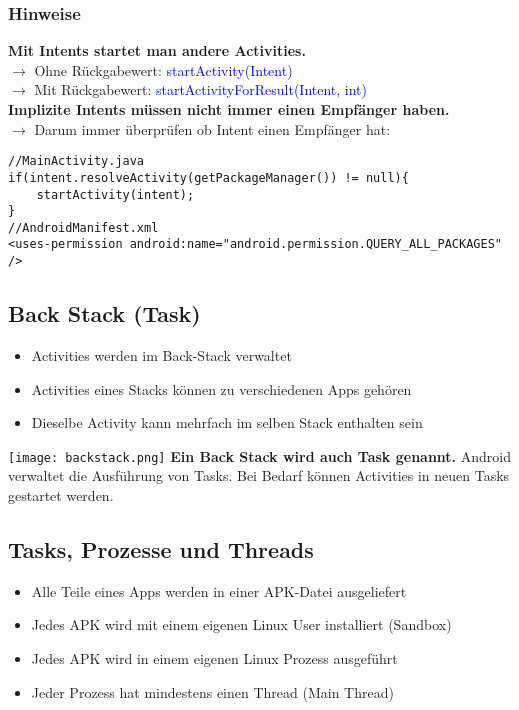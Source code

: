 \subsubsection{Hinweise}
\textbf{Mit Intents startet man andere Activities.}\\
$\rightarrow$ Ohne Rückgabewert: \textcolor{blue}{startActivity(Intent)}\\
$\rightarrow$ Mit Rückgabewert: \textcolor{blue}{startActivityForResult(Intent, int)}\\
\textbf{Implizite Intents müssen nicht immer einen Empfänger haben.}\\
$\rightarrow$ Darum immer überprüfen ob Intent einen Empfänger hat:
\begin{lstlisting}
//MainActivity.java
if(intent.resolveActivity(getPackageManager()) != null){
    startActivity(intent);
}
//AndroidManifest.xml
<uses-permission android:name="android.permission.QUERY_ALL_PACKAGES" />
\end{lstlisting}
\subsection{Back Stack (Task)}
\begin{itemize}[topsep=0pt, leftmargin=4mm]
    \setlength\itemsep{-0.3em}
    \item Activities werden im Back-Stack verwaltet
    \item Activities eines Stacks können zu verschiedenen Apps gehören
    \item Dieselbe Activity kann mehrfach im selben Stack enthalten sein
\end{itemize}
\texttt{[image: backstack.png]}
\textbf{Ein Back Stack wird auch Task genannt.} Android verwaltet die Ausführung von Tasks. Bei Bedarf können Activities in neuen Tasks gestartet werden.
\subsection{Tasks, Prozesse und Threads}
\begin{itemize}[topsep=0pt, leftmargin=4mm]
    \setlength\itemsep{-0.3em}
    \item Alle Teile eines Apps werden in einer APK-Datei ausgeliefert
    \item Jedes APK wird mit einem eigenen Linux User installiert (Sandbox)
    \item Jedes APK wird in einem eigenen Linux Prozess ausgeführt
    \item Jeder Prozess hat mindestens einen Thread (Main Thread)
\end{itemize}
